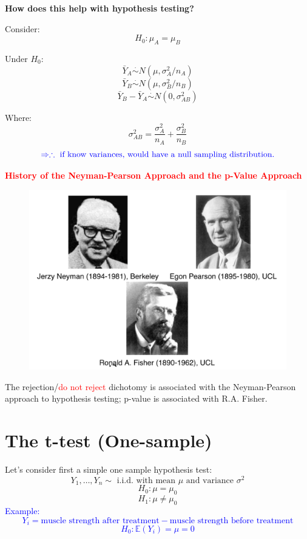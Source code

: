 \documentclass[14pt]{extarticle}
\begin{document}
\noindent \textbf{How does this help with hypothesis testing?}

Consider:
\[
H_0: \mu_A = \mu_B
\]

Under \( H_0 \):
\[
\bar{Y}_A \overset{\cdot}{\sim} N(\mu, \sigma_A^2 / n_A)
\]
\[
\bar{Y}_B \overset{\cdot}{\sim} N(\mu, \sigma_B^2 / n_B)
\]
\[
\bar{Y}_B - \bar{Y}_A \overset{\cdot}{\sim} N(0, \sigma_{AB}^2)
\]

Where:
\[
\sigma_{AB}^2 = \frac{\sigma_A^2}{n_A} + \frac{\sigma_B^2}{n_B}
\]
\[
\textcolor{blue}{\Rightarrow \therefore \text{ if know variances, would have a null sampling distribution.}}
\]

\newpage

\noindent \textcolor{red}{\textbf{History of the Neyman-Pearson Approach and the p-Value Approach}}

\begin{figure}[h]
    \centering
    \includegraphics[width=1\textwidth]{fig2.png}
\end{figure}

The rejection/\textcolor{red}{do not reject} dichotomy is associated with the Neyman-Pearson approach to hypothesis testing; p-value is associated with R.A. Fisher.

\newpage

\section*{The t-test (One-sample) }
Let's consider first a simple one sample hypothesis test:
\[
Y_1, \dots, Y_n \sim \text{ i.i.d.  with mean } \mu \text{ and variance } \sigma^2
\]
\[
H_0: \mu = \mu_0
\]
\[
H_1: \mu \neq \mu_0
\]
\textcolor{blue}{Example: 
\[
Y_i = \text{muscle strength after treatment} - \text{muscle strength before treatment}
\]
\[
H_0: \mathbb{E}(Y_i) = \mu = 0
\]}
\end{document}
